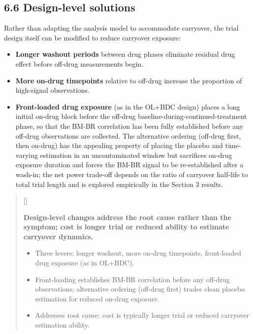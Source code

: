 \documentclass[
  11pt,
]{article}
\newcounter{pgraph}
\newenvironment{bullets}{%
  \stepcounter{pgraph}%
  \begin{quote}\small\sffamily\color[gray]{0.30}%
  {\normalfont\scriptsize\color[gray]{0.58}[\thepgraph]\enspace}}{%
  \end{quote}}
\begin{document}
\subsection{6.6 Design-level solutions}

Rather than adapting the analysis model to accommodate carryover, the
trial design itself can be modified to reduce carryover exposure:

\begin{itemize}
\item \textbf{Longer washout periods} between drug phases eliminate
  residual drug effect before off-drug measurements begin.
\item \textbf{More on-drug timepoints} relative to off-drug increase the
  proportion of high-signal observations.
\item \textbf{Front-loaded drug exposure} (as in the OL+BDC design)
  places a long initial on-drug block before the off-drug
  baseline-during-continued-treatment phase, so that the BM-BR
  correlation has been fully established before any off-drug
  observations are collected. The alternative ordering
  (off-drug first, then on-drug) has the appealing property of
  placing the placebo and time-varying estimation in an
  uncontaminated window but sacrifices on-drug exposure duration
  and forces the BM-BR signal to be re-established after a
  wash-in; the net power trade-off depends on the ratio of
  carryover half-life to total trial length and is explored
  empirically in the Section 3 results.
\end{itemize}

\begin{bullets}

\textbf{Design-level changes address the root cause rather than
the symptom; cost is longer trial or reduced ability to estimate
carryover dynamics.}

\begin{itemize}\setlength{\itemsep}{2pt}\setlength{\parskip}{0pt}
\item Three levers: longer washout, more on-drug timepoints,
  front-loaded drug exposure (as in OL+BDC).
\item Front-loading establishes BM-BR correlation before any
  off-drug observations; alternative ordering (off-drug first)
  trades clean placebo estimation for reduced on-drug exposure.
\item Addresses root cause; cost is typically longer trial or
  reduced carryover estimation ability.
\end{itemize}

\end{bullets}
\end{document}
